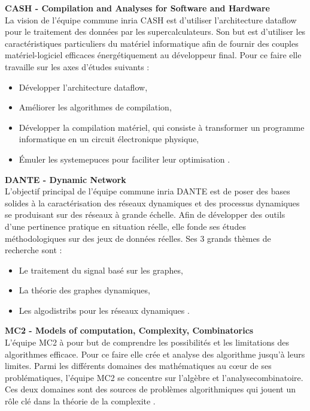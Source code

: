 \textbf{CASH - Compilation and Analyses for Software and Hardware}\\
La vision de l'équipe commune \gls{inria} CASH est d'utiliser l'architecture \gls{dataflow} pour le traitement des données par les supercalculateurs. Son but est d'utiliser les caractéristiques particuliers du matériel informatique afin de fournir des couples matériel-logiciel efficaces énergétiquement au développeur final. Pour ce faire elle travaille sur les axes d'études suivants :
\begin{itemize}
	\item Développer l'architecture \gls{dataflow},
	\item Améliorer les algorithmes de compilation,
	\item Développer la compilation matériel, qui consiste à transformer un programme informatique en un circuit électronique physique,
	\item Émuler les \glspl{systemepuce} pour faciliter leur optimisation \cite{cash}.\\
\end{itemize}

\textbf{DANTE - Dynamic Network}\\
L'objectif principal de l'équipe commune \gls{inria} DANTE est de poser des bases solides à la caractérisation des réseaux dynamiques et des processus dynamiques se produisant sur des réseaux à grande échelle. Afin de développer des outils d'une pertinence pratique en situation réelle, elle fonde ses études méthodologiques sur des jeux de données réelles. Ses 3 grands thèmes de recherche sont :
\begin{itemize}
	\item Le traitement du signal basé sur les graphes,
	\item La théorie des graphes dynamiques,
	\item Les \glspl{algodistrib} pour les réseaux dynamiques \cite{dante}.
\end{itemize}
\newpage
\textbf{MC2 - Models of computation, Complexity, Combinatorics}\\
L'équipe MC2 à pour but de comprendre les possibilités et les limitations des algorithmes efficace. Pour ce faire elle crée et analyse des algorithme jusqu'à leurs limites. Parmi les différents domaines des mathématiques au cœur de ses problématiques, l'équipe MC2 se concentre sur l'algèbre et l'\gls{analysecombinatoire}. Ces deux domaines sont des sources de problèmes algorithmiques qui jouent un rôle clé dans la théorie de la \gls{complexite} \cite{mc2}.\\


